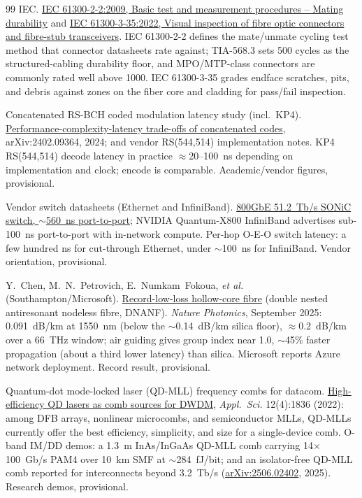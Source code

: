 \begin{thebibliography}{99}
IEC.
\newblock \href{https://webstore.ansi.org/standards/iec/iec61300ed2009-1296572}{IEC 61300-2-2:2009, Basic test and measurement procedures -- Mating durability}
and \href{https://webstore.iec.ch/en/publication/64254}{IEC 61300-3-35:2022, Visual inspection of fibre optic connectors and fibre-stub transceivers}.
\newblock IEC 61300-2-2 defines the mate/unmate cycling test method that connector
datasheets rate against; TIA-568.3 sets 500 cycles as the structured-cabling
durability floor, and MPO/MTP-class connectors are commonly rated well above
1000. IEC 61300-3-35 grades endface scratches, pits, and debris against zones on
the fiber core and cladding for pass/fail inspection.

Concatenated RS-BCH coded modulation latency study (incl.\ KP4).
\newblock \href{https://arxiv.org/abs/2402.09364}{Performance-complexity-latency trade-offs of concatenated codes}, arXiv:2402.09364, 2024; and vendor RS(544,514) implementation notes.
\newblock KP4 RS(544,514) decode latency in practice $\approx$20--100~ns depending
on implementation and clock; encode is comparable. Academic/vendor figures,
provisional.

Vendor switch datasheets (Ethernet and InfiniBand).
\newblock \href{https://cloudswit.ch/product/800gbe-switch-512tbps-enterprise-sonic/}{800GbE 51.2~Tb/s SONiC switch, $\sim$560~ns port-to-port}; NVIDIA Quantum-X800 InfiniBand advertises sub-100~ns port-to-port with in-network compute.
\newblock Per-hop O-E-O switch latency: a few hundred ns for cut-through Ethernet,
under $\sim$100~ns for InfiniBand. Vendor orientation, provisional.

Y.~Chen, M.~N.~Petrovich, E.~Numkam~Fokoua, \emph{et al.} (Southampton/Microsoft).
\newblock \href{https://doi.org/10.1038/s41566-025-01633-0}{Record-low-loss hollow-core fibre} (double nested antiresonant nodeless fibre, DNANF).
\newblock \emph{Nature Photonics}, September 2025: 0.091~dB/km at 1550~nm (below the
$\sim$0.14~dB/km silica floor), $\approx$0.2~dB/km over a 66~THz window; air guiding
gives group index near 1.0, $\sim$45\% faster propagation (about a third lower
latency) than silica. Microsoft reports Azure network deployment. Record result,
provisional.

Quantum-dot mode-locked laser (QD-MLL) frequency combs for datacom.
\newblock \href{https://www.mdpi.com/2076-3417/12/4/1836}{High-efficiency QD lasers as comb sources for DWDM}, \emph{Appl.\ Sci.} 12(4):1836 (2022): among DFB arrays, nonlinear microcombs, and semiconductor MLLs, QD-MLLs currently offer the best efficiency, simplicity, and size for a single-device comb.
\newblock O-band IM/DD demos: a 1.3~\textmu m InAs/InGaAs QD-MLL comb carrying 14$\times$100~Gb/s PAM4 over 10~km SMF at $\sim$284~fJ/bit; and an isolator-free QD-MLL comb reported for interconnects beyond 3.2~Tb/s (\href{https://arxiv.org/abs/2506.02402}{arXiv:2506.02402}, 2025). Research demos, provisional.


\end{thebibliography}
